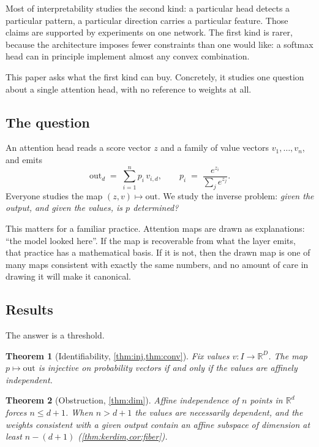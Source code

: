 \documentclass[11pt]{article}
\newtheorem{theorem}{Theorem}
\newcommand{\R}{\mathbb{R}}
\begin{document}
Most of interpretability studies the second kind: a particular head detects a
particular pattern, a particular direction carries a particular feature. Those
claims are supported by experiments on one network. The first kind is rarer,
because the architecture imposes fewer constraints than one would like: a
softmax head can in principle implement almost any convex combination.

This paper asks what the first kind can buy. Concretely, it studies one
question about a single attention head, with no reference to weights at all.

\subsection{The question}

An attention head reads a score vector $z$ and a family of value vectors
$v_1,\dots,v_n$, and emits
\[
  \mathrm{out}_d \;=\; \sum_{i=1}^{n} p_i \, v_{i,d},
  \qquad
  p_i \;=\; \frac{e^{z_i}}{\sum_j e^{z_j}} .
\]
Everyone studies the map $(z,v)\mapsto \mathrm{out}$. We study the inverse
problem: \emph{given the output, and given the values, is $p$ determined?}

This matters for a familiar practice. Attention maps are drawn as
explanations: ``the model looked here''. If the map is recoverable from what
the layer emits, that practice has a mathematical basis. If it is not, then the
drawn map is one of many maps consistent with exactly the same numbers, and no
amount of care in drawing it will make it canonical.

\subsection{Results}

The answer is a threshold.

\begin{theorem}[Identifiability, \cref{thm:inj,thm:conv}]
Fix values $v : I \to \R^D$. The map $p \mapsto \mathrm{out}$ is injective on
probability vectors if and only if the values are affinely independent.
\end{theorem}

\begin{theorem}[Obstruction, \cref{thm:dim}]
Affine independence of $n$ points in $\R^d$ forces $n \le d+1$. When
$n > d+1$ the values are necessarily dependent, and the weights consistent with
a given output contain an affine subspace of dimension at least $n-(d+1)$
(\cref{thm:kerdim,cor:fiber}).
\end{theorem}
\end{document}
